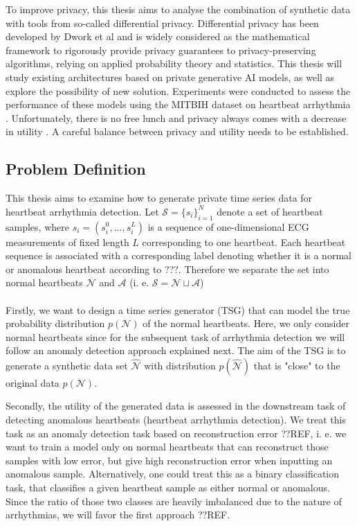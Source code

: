 To improve privacy, this thesis aims to analyse the combination of synthetic data with tools from so-called differential privacy. Differential privacy has been developed by Dwork et al \cite{10.1145/1866739.1866758} and is widely considered as the mathematical framework to rigorously provide privacy guarantees to privacy-preserving algorithms, relying on applied probability theory and statistics. This thesis will study existing architectures based on private generative AI models, as well as explore the possibility of new solution. Experiments were conducted to assess the performance of these models using the MITBIH dataset on heartbeat arrhythmia \parencite[][]{moody2001impact}. Unfortunately, there is no free lunch and privacy always comes with a decrease in utility \cite{stadler2022synthetic}. A careful balance between privacy and utility needs to be established.

\subsection{Problem Definition}

This thesis aims to examine how to generate private time series data for heartbeat arrhythmia detection. Let $\mathcal{S}=\{s_i\}_{i=1}^N$ denote a set of heartbeat samples, where $s_i=(s_i^0,..., s_i^L)$ is a sequence of one-dimensional ECG measurements of fixed length $L$ corresponding to one heartbeat. Each heartbeat sequence is associated with a corresponding label denoting whether it is a normal or anomalous heartbeat according to ???. Therefore we separate the set into normal heartbeats $\mathcal{N}$ and $\mathcal{A}$ (i. e. $\mathcal{S} = \mathcal{N} \sqcup \mathcal{A}$)

\paragraph{}

Firstly, we want to design a time series generator (TSG) that can model the true probability distribution $p(\mathcal{N})$ of the normal heartbeats. Here, we only consider normal heartbeats since for the subsequent task of arrhythmia detection we will follow an anomaly detection approach explained next. The aim of the TSG is to generate a synthetic data set $\widehat{\mathcal{N}}$ with distribution $p(\widehat{\mathcal{N}})$ that is "close" to the original data $p(\mathcal{N})$.

Secondly, the utility of the generated data is assessed in the downstream task of detecting anomalous heartbeats (heartbeat arrhythmia detection). We treat this task as an anomaly detection task based on reconstruction error ??REF, i. e. we want to train a model only on normal heartbeats that can reconstruct those samples with low error, but give high reconstruction error when inputting an anomalous sample. Alternatively, one could treat this as a binary classification task, that classifies a given heartbeat sample as either normal or anomalous. Since the ratio of those two classes are heavily imbalanced due to the nature of arrhythmias, we will favor the first approach ??REF.


